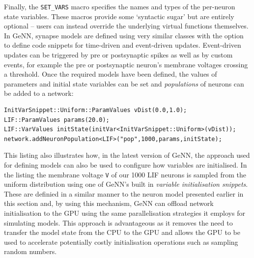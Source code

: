\documentclass[utf8]{frontiersSCNS} %
\begin{document}
Finally, the \lstinline{SET_VARS} macro specifies the names and types of the per-neuron state variables.
These macros provide some `syntactic sugar' but are entirely optional -- users can instead override the underlying virtual functions themselves.
In GeNN, synapse models are defined using very similar classes with the option to define code snippets for time-driven and event-driven updates.
Event-driven updates can be triggered by pre or postsynaptic spikes as well as by custom events, for example the pre or postsynaptic neuron's membrane voltages crossing a threshold.
Once the required models have been defined, the values of parameters and initial state variables can be set and \textit{populations} of neurons can be added to a network:
%
\begin{lstlisting}
InitVarSnippet::Uniform::ParamValues vDist(0.0,1.0);
LIF::ParamValues params(20.0);
LIF::VarValues initState(initVar<InitVarSnippet::Uniform>(vDist));
network.addNeuronPopulation<LIF>("pop",1000,params,initState);
\end{lstlisting}
%
This listing also illustrates how, in the latest version of GeNN, the approach used for defining models can also be used to configure how variables are initialised.
In the listing the membrane voltage \lstinline{V} of our \num{1000} LIF neurons is sampled from the uniform distribution using one of GeNN's built in \textit{variable initialisation snippets}.
These are definied in a similar manner to the neuron model presented earlier in this section and, by using this mechanism, GeNN can offload network initialisation to the GPU using the same parallelisation strategies it employs for simulating models.
This approach is advantageous as it removes the need to transfer the model state from the CPU to the GPU and allows the GPU to be used to accelerate potentially costly initialisation operations such as sampling random numbers.
\end{document}
